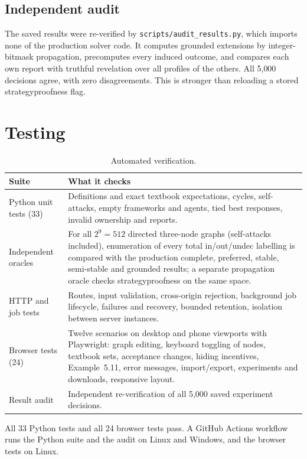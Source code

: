 \documentclass[11pt,a4paper]{article}
\newcommand{\file}[1]{\texttt{#1}}
\begin{document}
\subsection{Independent audit}
The saved results were re-verified by \file{scripts/audit\_results.py}, which imports none of the production solver code. It computes grounded extensions by integer-bitmask propagation, precomputes every induced outcome, and compares each own report with truthful revelation over all profiles of the others. All 5{,}000 decisions agree, with zero disagreements. This is stronger than reloading a stored strategyproofness flag.

\section{Testing}
\begin{table}[H]
\centering
\caption{Automated verification.}
\small
\begin{tabular}{@{}p{3.6cm}p{10.9cm}@{}}
\toprule
Suite & What it checks \\
\midrule
Python unit tests (33) & Definitions and exact textbook expectations, cycles, self-attacks, empty frameworks and agents, tied best responses, invalid ownership and reports. \\
Independent oracles & For all $2^{9}=512$ directed three-node graphs (self-attacks included), enumeration of every total in/out/undec labelling is compared with the production complete, preferred, stable, semi-stable and grounded results; a separate propagation oracle checks strategyproofness on the same space. \\
HTTP and job tests & Routes, input validation, cross-origin rejection, background job lifecycle, failures and recovery, bounded retention, isolation between server instances. \\
Browser tests (24) & Twelve scenarios on desktop and phone viewports with Playwright: graph editing, keyboard toggling of nodes, textbook sets, acceptance changes, hiding incentives, Example~5.11, error messages, import/export, experiments and downloads, responsive layout. \\
Result audit & Independent re-verification of all 5{,}000 saved experiment decisions. \\
\bottomrule
\end{tabular}
\end{table}

All 33 Python tests and all 24 browser tests pass. A GitHub Actions workflow runs the Python suite and the audit on Linux and Windows, and the browser tests on Linux.
\end{document}
